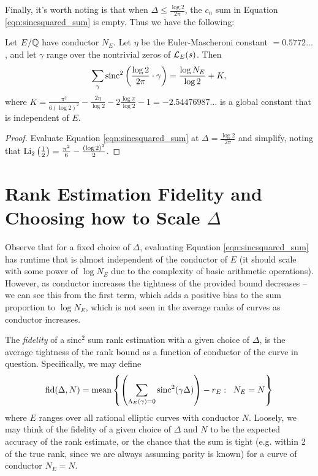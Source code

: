 Finally, it's worth noting is that when $\Delta \le \frac{\log 2}{2\pi}$, the $c_n$ sum in Equation \ref{eqn:sincsquared_sum} is empty. Thus we have the following:
\begin{corollary}
Let $E/\mathbb{Q}$ have conductor $N_E$. Let $\eta$ be the Euler-Mascheroni constant $=0.5772\ldots$, and let $\gamma$ range over the nontrivial zeros of $\mathcal{L}_E(s)$. Then
\begin{equation}
\sum_{\gamma} \text{sinc}^2\left(\frac{\log 2}{2\pi} \cdot \gamma \right) = \frac{\log N_E}{\log 2} + K,
\end{equation}
where $K = \frac{\pi^2}{6(\log 2)^2} - \frac{2\eta}{\log 2} - 2\frac{\log \pi}{\log 2} - 1 = -2.54476987\ldots$ is a global constant that is independent of $E$.
\end{corollary}
\begin{proof}
Evaluate Equation \ref{eqn:sincsquared_sum} at $\Delta = \frac{\log 2}{2\pi}$ and simplify, noting that $\text{Li}_2\left(\frac{1}{2}\right) = \frac{\pi^2}{6} - \frac{(\log 2)^2}{2}$.
\end{proof}

\newpage
\section{Rank Estimation Fidelity and Choosing how to Scale $\Delta$}

Observe that for a fixed choice of $\Delta$, evaluating Equation \ref{eqn:sincsquared_sum} has runtime that is almost independent of the conductor of $E$ (it should scale with some power of $\log N_E$ due to the complexity of basic arithmetic operations). However, as conductor increases the tightness of the provided bound decreases -- we can see this from the first term, which adds a positive bias to the sum proportion to $\log N_E$, which is not seen in the average ranks of curves as conductor increases. \\

\begin{definition}
The {\it fidelity} of a sinc$^2$ sum rank estimation with a given choice of $\Delta$, is the average tightness of the rank bound as a function of conductor of the curve in question. Specifically, we may define
\begin{equation}
\mbox{fid}(\Delta,N) = \mbox{mean}\left\{\left(\sum_{\Lambda_E(\gamma)=0}\text{sinc}^2(\gamma \Delta)\right) - r_E:\;\; N_E = N\right\}
\end{equation}
where $E$ ranges over all rational elliptic curves with conductor $N$. Loosely, we may think of the fidelity of a given choice of $\Delta$ and $N$ to be the expected accuracy of the rank estimate, or the chance that the sum is tight (e.g. within 2 of the true rank, since we are always assuming parity is known) for a curve of conductor $N_E=N$. 
\end{definition}

